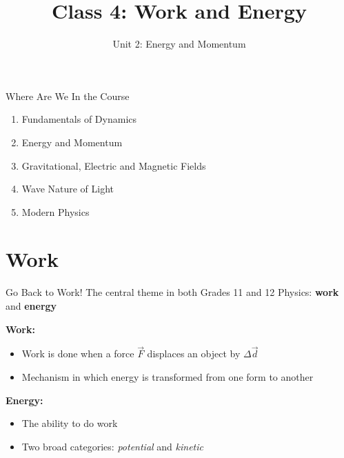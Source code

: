 \documentclass[12pt,compress,aspectratio=169]{beamer}
\title{Class 4: Work and Energy}
\subtitle{Unit 2: Energy and Momentum}
\begin{document}
\begin{frame}
  \maketitle
\end{frame}



\begin{frame}{Where Are We In the Course}
  \begin{enumerate}
  \item Fundamentals of Dynamics
  \item<alert@1>Energy and Momentum
  \item Gravitational, Electric and Magnetic Fields
  \item Wave Nature of Light
  \item Modern Physics
  \end{enumerate}
\end{frame}



\section{Work}

\begin{frame}{Go Back to Work!}
  The central theme in both Grades 11 and 12 Physics: \textbf{work} and
  \textbf{energy}

  \vspace{.1in}\textbf{Work:}
  \begin{itemize}
  \item Work is done when a force $\vec F$ displaces an object by $\Delta\vec d$
  \item Mechanism in which energy is transformed from one form to another
  \end{itemize}
  
  \vspace{.1in}\textbf{Energy:}
  \begin{itemize}
  \item The ability to do work
  \item Two broad categories: \emph{potential} and \emph{kinetic}
  \end{itemize}
\end{frame}
\end{document}
